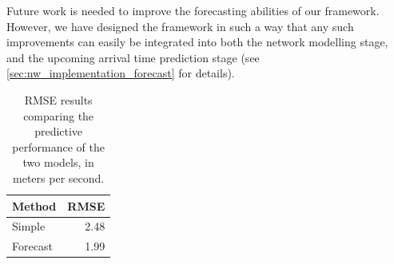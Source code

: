 Future work is needed to improve the forecasting abilities of our framework. However, we have designed the framework in such a way that any such improvements can easily be integrated into both the network modelling stage, and the upcoming arrival time prediction stage (see \cref{sec:nw_implementation_forecast} for details).

\begin{table}

\caption{\label{tab:tt_pred_rmse}RMSE results comparing the predictive performance of the two models, in meters per second.}
\centering
\begin{tabular}[t]{lr}
\toprule
Method & RMSE\\
\midrule
Simple & 2.48\\
Forecast & 1.99\\
\bottomrule
\end{tabular}
\end{table}


